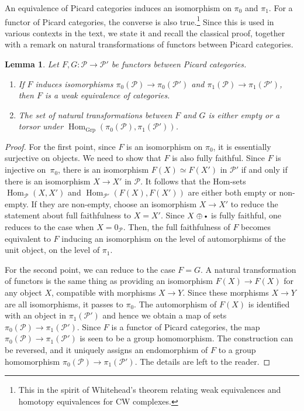 \documentclass[JEP,XML,SOM,Unicode,published]{cedram}
\newcommand{\sbullet}{{\scriptscriptstyle\bullet}}
\newcommand{\csbullet}{{\raisebox{1pt}{$\sbullet$}}}
\theoremstyle{plain}
\newtheorem{lemma}[theorem]{Lemma}
\theoremstyle{definition}
\newcommand{\Pcal}{\mathcal P}
\DeclareMathOperator{\Hom}{Hom}
\begin{document}
An equivalence of Picard categories induces an isomorphism on $\pi_0$ and $\pi_1$. For a functor of Picard categories, the converse is also true.\footnote{This in the spirit of Whitehead's theorem relating weak equivalences and homotopy equivalences for CW complexes.} Since this is used in various contexts in the text, we state it and recall the classical proof, together with a remark on natural transformations of functors between Picard categories.
\begin{lemma}\label{lemma:isoPicard}
Let $F, G: \Pcal \to \Pcal'$ be functors between Picard categories.
\begin{enumerate}
\item If $F$ induces isomorphisms $\pi_0(\Pcal) \to \pi_0(\Pcal')$ and $\pi_1(\Pcal) \to \pi_1(\Pcal')$, then $F$ is a weak equivalence of categories.
\item The set of natural transformations between $F$ and $G$ is either empty or a torsor under $\Hom_{\mathrm{Grp}}(\pi_0(\Pcal), \pi_1(\Pcal'))$.
\end{enumerate}
\end{lemma}
\begin{proof}
For the first point, since $F$ is an isomorphism on $\pi_0$, it is essentially surjective on objects. We need to show that $F$ is also fully faithful. Since $F$ is injective on~$\pi_0$, there is an isomorphism $F(X) \simeq F(X')$ in $\Pcal'$ if and only if there is an isomorphism $X\to X'$ in $\Pcal$. It follows that the Hom-sets $\Hom_{\Pcal}(X,X')$ and $\Hom_{\Pcal'}(F(X), F(X'))$ are either both empty or non-empty. If they are non-empty, choose an isomorphism $X\to X'$ to reduce the statement about full faithfulness to $X=X'$. Since $X\oplus \csbullet$ is fully faithful, one reduces to the case when $X = 0_{\Pcal}$. Then, the full faithfulness of $F$ becomes equivalent to $F$ inducing an isomorphism on the level of automorphisms of the unit object, \ie on the level of $\pi_1$.

For the second point, we can reduce to the case $F=G$. A natural transformation of functors is the same thing as providing an isomorphism $F(X) \to F(X)$ for any object $X$, compatible with morphisms $X\to Y$. Since these morphisms $X\to Y$ are all isomorphisms, it passes to $\pi_0$. The automorphism of $F(X)$ is identified with an object in $\pi_1(\Pcal')$ and hence we obtain a map of sets $\pi_0(\Pcal) \to \pi_1(\Pcal')$. Since $F$ is a functor of Picard categories, the map $\pi_0(\Pcal) \to \pi_1(\Pcal')$ is seen to be a group homomorphism. The construction can be reversed, and it uniquely assigns an endomorphism of $F$ to a group homomorphism $\pi_0(\Pcal) \to \pi_1(\Pcal')$. The details are left to the reader.
\end{proof}
\end{document}
